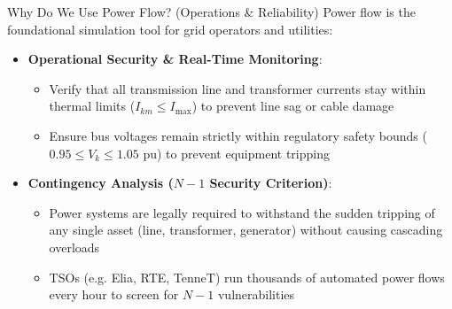\begin{frame}{Why Do We Use Power Flow? (Operations \& Reliability)}
    Power flow is the foundational simulation tool for grid operators and utilities:
    
    \begin{itemize}
        \item \textbf{Operational Security \& Real-Time Monitoring}:
        \begin{itemize}
            \item Verify that all transmission line and transformer currents stay within thermal limits ($I_{km} \le I_{\max}$) to prevent line sag or cable damage
            \item Ensure bus voltages remain strictly within regulatory safety bounds ($0.95 \le V_k \le 1.05\text{ pu}$) to prevent equipment tripping
        \end{itemize}
        \vspace{0.2cm}
        \item \textbf{Contingency Analysis ($N-1$ Security Criterion)}:
        \begin{itemize}
            \item Power systems are legally required to withstand the sudden tripping of any single asset (line, transformer, generator) without causing cascading overloads
            \item TSOs (e.g. Elia, RTE, TenneT) run thousands of automated power flows every hour to screen for $N-1$ vulnerabilities
        \end{itemize}
    \end{itemize}
\end{frame}

